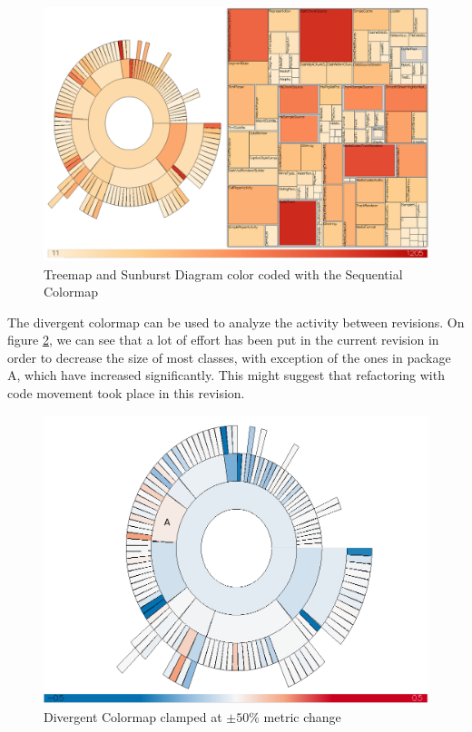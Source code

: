 \begin{figure}[H]
  \centering
  \includegraphics[width=1\textwidth]{figures/colormap_hier.png}
  \caption{Treemap and Sunburst Diagram color coded with the Sequential Colormap}
  \label{fig:colormap_hier}
\end{figure}

The divergent colormap can be used to analyze the activity between revisions. On figure \ref{fig:colormap_div_sun}, we can see that a lot of effort has been put in the current revision in order to decrease the size of most classes, with exception of the ones in package A, which have increased significantly. This might suggest that refactoring with code movement took place in this revision.

\begin{figure}[H]
  \centering
  \includegraphics[width=1.0\textwidth]{figures/colormap_div_sun.png}
  \caption{Divergent Colormap clamped at $\pm50\%$ metric change}
  \label{fig:colormap_div_sun}
\end{figure}

